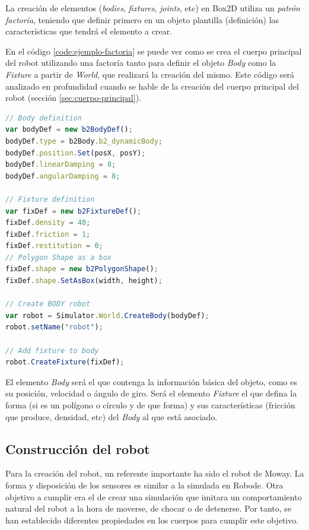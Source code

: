 La creación de elementos (\emph{bodies}, \emph{fixtures}, \emph{joints}, etc) en Box2D utiliza un \emph{patrón factoría}, teniendo que definir primero en un objeto plantilla (definición) las características que tendrá el elemento a crear.

En el código \ref{code:ejemplo-factoria} se puede ver como se crea el cuerpo principal del robot utilizando una factoría tanto para definir el objeto \emph{Body} como la \emph{Fixture} a partir de \emph{World}, que realizará la creación del mismo. Este código será analizado en profundidad cuando se hable de la creación del cuerpo principal del robot (sección \ref{sec:cuerpo-principal}).

\begin{lstlisting}[language={Javascript},label={code:ejemplo-factoria}, caption={Creación del cuerpo principal del robot utilizando la librería Box2dweb.}]
// Body definition
var bodyDef = new b2BodyDef(); 
bodyDef.type = b2Body.b2_dynamicBody;
bodyDef.position.Set(posX, posY);
bodyDef.linearDamping = 8;
bodyDef.angularDamping = 8;

// Fixture definition
var fixDef = new b2FixtureDef(); 
fixDef.density = 40;
fixDef.friction = 1;
fixDef.restitution = 0;
// Polygon Shape as a box
fixDef.shape = new b2PolygonShape(); 
fixDef.shape.SetAsBox(width, height);

// Create BODY robot
var robot = Simulator.World.CreateBody(bodyDef);
robot.setName("robot");

// Add fixture to body
robot.CreateFixture(fixDef);
\end{lstlisting}


El elemento \emph{Body} será el que contenga la información básica del objeto, como es su posición, velocidad o ángulo de giro. Será el elemento \emph{Fixture} el que defina la forma (si es un polígono o círculo y de que forma) y sus características (fricción que produce, densidad, etc) del \emph{Body} al que está asociado.


\subsection{Construcción del robot}
\label{sec:contruccion-robot}

Para la creación del robot, un referente importante ha sido el robot de Moway. La forma y disposición de los sensores es similar a la simulada en Robode. Otra objetivo a cumplir era el de crear una simulación que imitara un comportamiento natural del robot a la hora de moverse, de chocar o de detenerse. Por tanto, se han establecido diferentes propiedades en los cuerpos para cumplir este objetivo.

